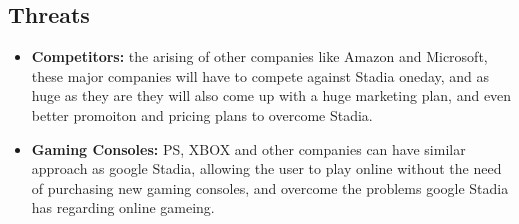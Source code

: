 \subsection{Threats}
\begin{itemize}    
    \item \textbf{Competitors:}
        the arising of other companies like Amazon and Microsoft, these major companies will have to compete against
        Stadia oneday, and as huge as they are they will also come up with a huge marketing plan, and even better 
        promoiton and pricing plans to overcome Stadia.

    \item \textbf{Gaming Consoles:}
        PS, XBOX and other companies can have similar   approach as google Stadia, allowing the user to play online 
        without the need of purchasing new gaming consoles, and overcome the problems google Stadia has regarding 
        online gameing.
\end{itemize}